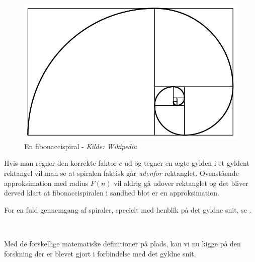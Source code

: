 {\begin{figure}[h!]
\begin{center}
		\includegraphics[scale=0.35,angle=0]{afsnit/baggrund/billeder/Fibonacci_spiral}
	\end{center}
	\caption[En fibonaccispiral]{En fibonaccispiral - \emph{Kilde: Wikipedia}}
	\label{fibonacci_spiral}
\end{figure}
Hvis man regner den korrekte faktor $c$ ud og
tegner en ægte gylden i et gyldent rektangel vil man se at spiralen
faktisk går \emph{udenfor} rektanglet\cite{Sharp2002}. Ovenstående
approksimation med radius $F(n)$ vil aldrig gå udover rektanglet og det
bliver derved klart at fibonaccispiralen i sandhed blot er en
approksimation.

For en fuld gennemgang af spiraler, specielt med henblik på det gyldne
snit, se \cite{Sharp2002}.

\ %

Med de forskellige matematiske definitioner på plads, kan vi nu kigge på
den forskning der er blevet gjort i forbindelse med det gyldne snit.
}
